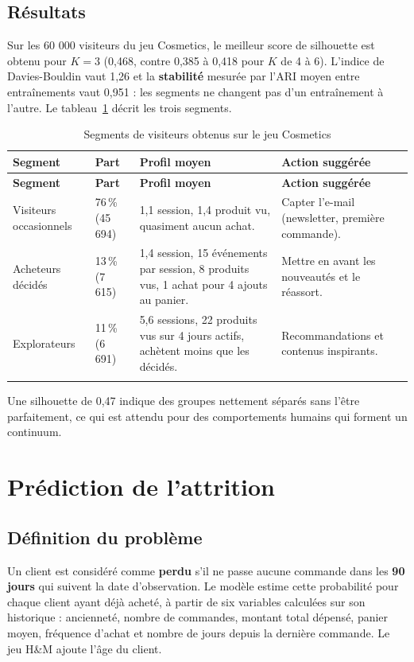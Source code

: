 \subsection{Résultats}
Sur les 60 000 visiteurs du jeu Cosmetics, le meilleur score de silhouette est obtenu pour $K = 3$ (0,468, contre 0,385 à 0,418 pour $K$ de 4 à 6). L'indice de Davies-Bouldin vaut 1,26 et la \textbf{stabilité} mesurée par l'ARI moyen entre entraînements vaut 0,951 : les segments ne changent pas d'un entraînement à l'autre. Le tableau~\ref{tab:segments} décrit les trois segments.
\renewcommand{\arraystretch}{1.3}
\begin{longtable}{|p{3.2cm}|p{1.8cm}|p{5.2cm}|p{4.2cm}|}
\hline
\textbf{Segment} & \textbf{Part} & \textbf{Profil moyen} & \textbf{Action suggérée} \\
\hline
\endfirsthead
\hline
\textbf{Segment} & \textbf{Part} & \textbf{Profil moyen} & \textbf{Action suggérée} \\
\hline
\endhead
Visiteurs occasionnels & 76\,\% (45 694) & 1,1 session, 1,4 produit vu, quasiment aucun achat. & Capter l'e-mail (newsletter, première commande). \\
\hline
Acheteurs décidés & 13\,\% (7 615) & 1,4 session, 15 événements par session, 8 produits vus, 1 achat pour 4 ajouts au panier. & Mettre en avant les nouveautés et le réassort. \\
\hline
Explorateurs & 11\,\% (6 691) & 5,6 sessions, 22 produits vus sur 4 jours actifs, achètent moins que les décidés. & Recommandations et contenus inspirants. \\
\hline
\caption{Segments de visiteurs obtenus sur le jeu Cosmetics}
\label{tab:segments}
\end{longtable}
Une silhouette de 0,47 indique des groupes nettement séparés sans l'être parfaitement, ce qui est attendu pour des comportements humains qui forment un continuum.

\section{Prédiction de l'attrition}
\subsection{Définition du problème}
Un client est considéré comme \textbf{perdu} s'il ne passe aucune commande dans les \textbf{90 jours} qui suivent la date d'observation. Le modèle estime cette probabilité pour chaque client ayant déjà acheté, à partir de six variables calculées sur son historique : ancienneté, nombre de commandes, montant total dépensé, panier moyen, fréquence d'achat et nombre de jours depuis la dernière commande. Le jeu H\&M ajoute l'âge du client.

